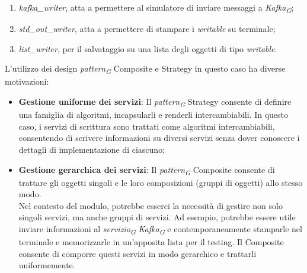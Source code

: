\begin{enumerate}
    \item \textit{kafka\_writer}, atta a permettere al simulatore di inviare messaggi a \textit{Kafka}\textsubscript{\textit{G}};
    \item \textit{std\_out\_writer}, atta a permettere di stampare i \textit{writable} su terminale;
    \item \textit{list\_writer}, per il salvataggio su una lista degli oggetti di tipo \textit{writable}.
\end{enumerate}
L'utilizzo dei design \textit{pattern}\textsubscript{\textit{G}} Composite e Strategy in questo caso ha diverse motivazioni:
\begin{itemize}
    \item \textbf{Gestione uniforme dei servizi}: Il \textit{pattern}\textsubscript{\textit{G}} Strategy consente di definire una famiglia di algoritmi, incapsularli e renderli intercambiabili. In questo caso, i servizi di scrittura sono trattati come algoritmi intercambiabili, consentendo di scrivere informazioni su diversi servizi senza dover conoscere i dettagli di implementazione di ciascuno;
    \item \textbf{Gestione gerarchica dei servizi}: Il \textit{pattern}\textsubscript{\textit{G}} Composite consente di trattare gli oggetti singoli e le loro composizioni (gruppi di oggetti) allo stesso modo. \\
    Nel contesto del modulo, potrebbe esserci la necessità di gestire non solo singoli servizi, ma anche gruppi di servizi. Ad esempio, potrebbe essere utile inviare informazioni al \textit{servizio}\textsubscript{\textit{G}} \textit{Kafka}\textsubscript{\textit{G}} e contemporaneamente stamparle nel terminale e memorizzarle in un'apposita lista per il testing. Il Composite consente di comporre questi servizi in modo gerarchico e trattarli uniformemente.
\end{itemize}


